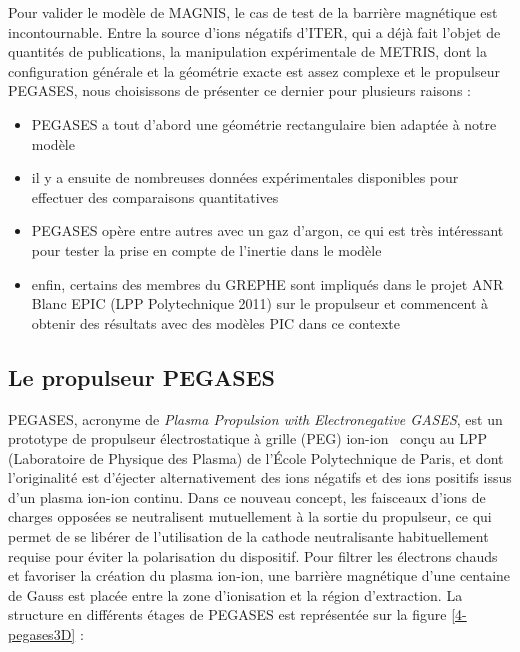 \begin{refsection}
Pour valider le modèle de MAGNIS, le cas de test de la barrière magnétique est
incontournable. Entre la source d'ions négatifs d'ITER, qui a déjà fait l'objet
de quantités de publications, la manipulation expérimentale de METRIS, dont la
configuration générale et la géométrie exacte est assez complexe et le propulseur PEGASES,
nous choisissons de présenter ce dernier pour plusieurs raisons : 

\begin{itemize}
  \item PEGASES a tout d'abord une géométrie rectangulaire bien adaptée à notre
  modèle 
  \item il y a ensuite de nombreuses données expérimentales disponibles pour
  effectuer des comparaisons quantitatives
  \item PEGASES opère entre autres avec un gaz d'argon, ce
  qui est très intéressant pour tester la prise en compte de l'inertie dans le
  modèle
  \item enfin, certains des membres du GREPHE sont impliqués dans le projet ANR
  Blanc EPIC (LPP Polytechnique 2011) sur le propulseur et commencent à obtenir
  des résultats avec des modèles PIC dans ce contexte
\end{itemize}


\subsection{Le propulseur PEGASES}
PEGASES, acronyme de \emph{Plasma Propulsion with Electronegative GASES}, est
un prototype de propulseur électrostatique à grille (PEG)
ion-ion~\parencite{Chabert} conçu au LPP (Laboratoire de Physique des
Plasma) de l'École Polytechnique de Paris, et dont l'originalité est d'éjecter
alternativement des ions négatifs et des ions positifs issus d'un plasma ion-ion continu.
Dans ce nouveau concept, les faisceaux d'ions de charges opposées se
neutralisent mutuellement à la sortie du propulseur, ce qui permet de se
libérer de l'utilisation de la cathode neutralisante habituellement requise
pour éviter la polarisation du dispositif.
Pour filtrer les électrons chauds et favoriser la création du plasma ion-ion, une
barrière magnétique d'une centaine de Gauss est placée entre la zone
d'ionisation et la région d'extraction. La structure en différents étages de PEGASES est représentée sur la
figure \ref{4-pegases3D} :


\end{refsection}
